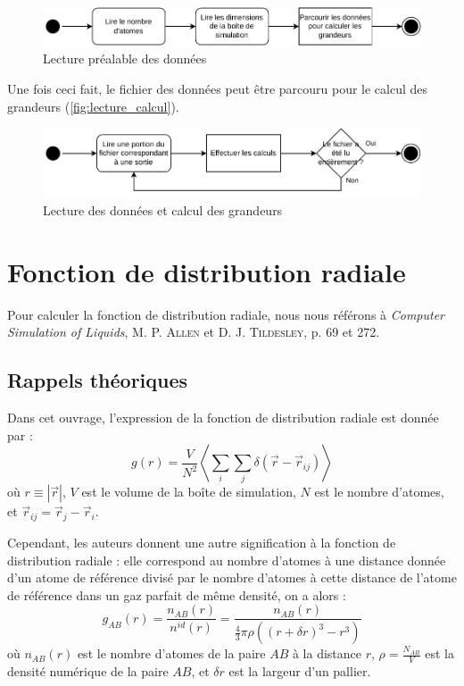 \documentclass[11pt, a4paper]{article}
\begin{document}
\begin{figure}[hbpt]
	\centering
	\includegraphics[width=\linewidth]{demarche-preliminaires.pdf}
	\caption{Lecture préalable des données}
	\label{fig:lecture_prealable}
\end{figure}

Une fois ceci fait, le fichier des données peut être parcouru pour le calcul des grandeurs (\autoref{fig:lecture_calcul}).

\begin{figure}[hptb]
	\centering
	\includegraphics[width=\linewidth]{demarche-lecture.pdf}
	\caption{Lecture des données et calcul des grandeurs}
	\label{fig:lecture_calcul}
\end{figure}

\section{Fonction de distribution radiale}

Pour calculer la fonction de distribution radiale, nous nous référons à \emph{Computer Simulation of Liquids}, \textsc{M. P. Allen} et \textsc{D. J. Tildesley}, p. 69 et 272.

	\subsection{Rappels théoriques}

Dans cet ouvrage, l'expression de la fonction de distribution radiale est donnée par :
\begin{equation*}
	\boxed%
	{
		g (r) = \frac{V}{N^2} \left\langle \sum_{i} \sum_{j} \delta (\vec{r} - \vec{r}_{ij}) \right\rangle
	}
\end{equation*}
où $r \equiv |\vec{r}|$, $V$ est le volume de la boîte de simulation, $N$ est le nombre d'atomes, et $\vec{r}_{ij} = \vec{r}_j - \vec{r}_i$.

Cependant, les auteurs donnent une autre signification à la fonction de distribution radiale : elle correspond au nombre d'atomes à une distance donnée d'un atome de référence divisé par le nombre d'atomes à cette distance de l'atome de référence dans un gaz parfait de même densité, on a alors :
\begin{equation}\label{eq:rdf}
	\boxed%
	{
		g_{AB} (r) = \frac{n_{AB} (r)}{n^{id} (r)} = \frac{n_{AB} (r)}{\frac{4}{3} \pi \rho \left( \left( r + \delta r \right)^3 - r^3 \right)}
	}
\end{equation}
où $n_{AB} (r)$ est le nombre d'atomes de la paire $AB$ à la distance $r$, $\rho = \frac{N_{AB}}{V}$ est la densité numérique de la paire $AB$, et $\delta r$ est la largeur d'un pallier.
\end{document}
